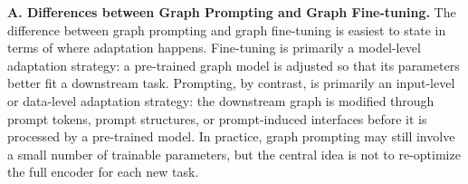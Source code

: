 

\textbf{A. Differences between Graph Prompting and Graph Fine-tuning.}
The difference between graph prompting and graph fine-tuning is easiest to state in terms of where adaptation happens. Fine-tuning is primarily a model-level adaptation strategy: a pre-trained graph model is adjusted so that its parameters better fit a downstream task. Prompting, by contrast, is primarily an input-level or data-level adaptation strategy: the downstream graph is modified through prompt tokens, prompt structures, or prompt-induced interfaces before it is processed by a pre-trained model. In practice, graph prompting may still involve a small number of trainable parameters, but the central idea is not to re-optimize the full encoder for each new task.


